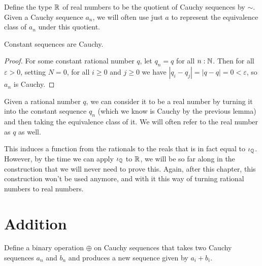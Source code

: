 \documentclass[../../math.tex]{subfiles}
\begin{document}
\begin{definition}
    Define the type $\mathbb{R}$ of real numbers to be the quotient of Cauchy sequences
    by $\sim$.  Given a Cauchy sequence $a_n$, we will often use just $a$ to
    represent the equivalence class of $a_n$ under this quotient.
\end{definition}

\begin{lemma} \label{rat_to_real_cauchy}
    Constant sequences are Cauchy.
\end{lemma}
\begin{proof}
    For some constant rational number $q$, let $q_n = q$ for all $n : \mathbb{N}$.  Then
    for all $\varepsilon > 0$, setting $N = 0$, for all $i \geq 0$ and $j \geq
    0$ we have $|q_i - q_j| = |q - q| = 0 < \varepsilon$, so $a_n$ is Cauchy.
\end{proof}

\begin{definition}
    Given a rational number $q$, we can consider it to be a real number by
    turning it into the constant sequence $q_n$ (which we know is Cauchy by the
    previous lemma) and then taking the equivalence class of it.  We will often
    refer to the real number as $q$ as well.
\end{definition}

This induces a function from the rationals to the reals that is in fact equal to
$\iota_{\mathbb{Q}}$.  However, by the time we can apply $\iota_{\mathbb{Q}}$ to $\mathbb{R}$, we will be so far along
in the construction that we will never need to prove this.  Again, after this
chapter, this construction won't be used anymore, and with it this way of
turning rational numbers to real numbers.

\section{Addition}

\begin{definition}
    Define a binary operation $\oplus$ on Cauchy sequences that takes two Cauchy
    sequences $a_n$ and $b_n$ and produces a new sequence given by $a_i + b_i$.
\end{definition}
\end{document}
